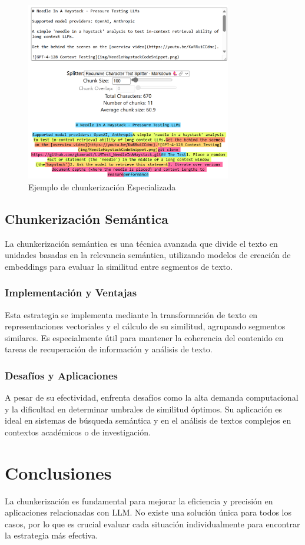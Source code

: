 \begin{figure}[!h]
\centering
\includegraphics[width=0.8\textwidth]{figuras/capitulo4/character_md_100.png}
\caption{Ejemplo de chunkerización Especializada}
\label{fig:imagen_chunk_md}
\end{figure}

\subsection{Chunkerización Semántica}

La chunkerización semántica es una técnica avanzada que divide el texto en unidades basadas en la relevancia semántica, utilizando modelos de creación de embeddings para evaluar la similitud entre segmentos de texto.

\subsubsection{Implementación y Ventajas}
Esta estrategia se implementa mediante la transformación de texto en representaciones vectoriales y el cálculo de su similitud, agrupando segmentos similares. Es especialmente útil para mantener la coherencia del contenido en tareas de recuperación de información y análisis de texto.

\subsubsection{Desafíos y Aplicaciones}
A pesar de su efectividad, enfrenta desafíos como la alta demanda computacional y la dificultad en determinar umbrales de similitud óptimos. Su aplicación es ideal en sistemas de búsqueda semántica y en el análisis de textos complejos en contextos académicos o de investigación.


\section{Conclusiones}
La chunkerización es fundamental para mejorar la eficiencia y precisión en aplicaciones relacionadas con LLM. No existe una solución única para todos los casos, por lo que es crucial evaluar cada situación individualmente para encontrar la estrategia más efectiva.
